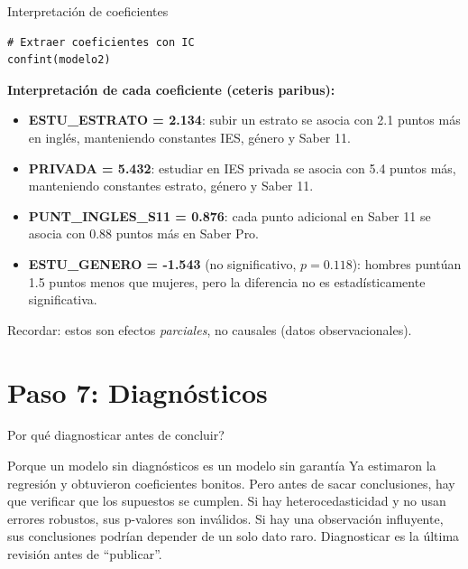 \documentclass[aspectratio=169, 11pt]{beamer}
\begin{document}
\begin{frame}[fragile]{Interpretación de coeficientes}
\begin{lstlisting}
# Extraer coeficientes con IC
confint(modelo2)
\end{lstlisting}

\vspace{0.3cm}
\textbf{Interpretación de cada coeficiente (ceteris paribus):}
\begin{itemize}
\item \textbf{ESTU\_ESTRATO = 2.134}: subir un estrato se asocia con 2.1 puntos más en inglés, manteniendo constantes IES, género y Saber 11.
\item \textbf{PRIVADA = 5.432}: estudiar en IES privada se asocia con 5.4 puntos más, manteniendo constantes estrato, género y Saber 11.
\item \textbf{PUNT\_INGLES\_S11 = 0.876}: cada punto adicional en Saber 11 se asocia con 0.88 puntos más en Saber Pro.
\item \textbf{ESTU\_GENERO = -1.543} (no significativo, $p = 0.118$): hombres puntúan 1.5 puntos menos que mujeres, pero la diferencia no es estadísticamente significativa.
\end{itemize}

\vspace{0.3cm}
\small
\textcolor{javeriana}{Recordar}: estos son efectos \textit{parciales}, no causales (datos observacionales).
\end{frame}

\section{Paso 7: Diagnósticos}

\begin{frame}{\textquestiondown{}Por qu\'e diagnosticar antes de concluir?}
\begin{exampleblock}{Porque un modelo sin diagn\'osticos es un modelo sin garant\'ia}
\small
Ya estimaron la regresi\'on y obtuvieron coeficientes bonitos. Pero antes de sacar conclusiones, hay que verificar que los supuestos se cumplen. Si hay heterocedasticidad y no usan errores robustos, sus p-valores son inv\'alidos. Si hay una observaci\'on influyente, sus conclusiones podr\'ian depender de un solo dato raro. Diagnosticar es la \'ultima revisi\'on antes de ``publicar''.
\end{exampleblock}
\end{frame}
\end{document}
